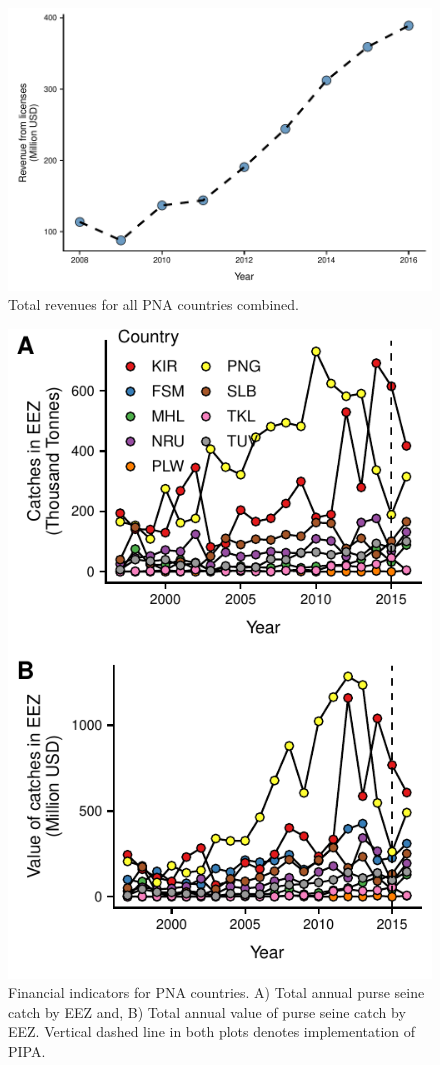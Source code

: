 \documentclass[12pt]{article}
\begin{document}
\begin{figure}
\centering
	\includegraphics{img/total_PNA_revenues.pdf}
	\caption{\label{fig:total_PNA_revenues}Total revenues for all PNA countries combined.}
\end{figure}

\begin{figure}
\centering
	\includegraphics{img/catches.pdf}
	\caption{\label{fig:catches}Financial indicators for PNA countries. A) Total annual purse seine catch by EEZ and, B) Total annual value of purse seine catch by EEZ. Vertical dashed line in both plots denotes implementation of PIPA.}
\end{figure}
\end{document}
